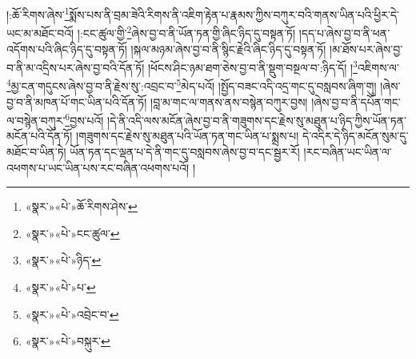 །:ཆོ་རིགས་ཞེས་\footnote{«སྣར་»«པེ་»ཆོ་རིགས་ཤེས་}སྨོས་པས་ནི་བྲམ་ཟེའི་རིགས་ནི་འཇིག་རྟེན་པ་རྣམས་ཀྱིས་བཀུར་བའི་གནས་ཡིན་པའི་ཕྱིར་དེ་ཡང་མ་མཐོང་བའོ། །:ངང་ཚུལ་གྱི་\footnote{«སྣར་»«པེ་»ངང་ཚུལ་}ཞེས་བྱ་བ་ནི་ཡོན་ཏན་གྱི་ཞིང་ཉིད་དུ་བསྟན་ཏོ། །དད་པ་ཞེས་བྱ་བ་ནི་ཕན་འདོགས་པའི་ཞིང་ཉིད་དུ་བསྟན་ཏོ། །སྐལ་མཉམ་ཞེས་བྱ་བ་ནི་སྙིང་རྗེའི་ཞིང་ཉིད་དུ་བསྟན་ཏོ། །མ་ཐོས་པར་ཞེས་བྱ་བ་ནི་མ་འདྲིས་པར་ཞེས་བྱ་བའི་དོན་ཏོ། །ཕོངས་ཤིང་ཉམ་ཐག་ཅེས་བྱ་བ་ནི་སྡུག་བསྔལ་བ་:ཉིད་དོ། །\footnote{«སྣར་»«པེ་»ཉིད་}འཇིགས་ལ་\footnote{«སྣར་»«པེ་»པ་}མྱ་ངན་གདུངས་ཞེས་བྱ་བ་ནི་རྗེས་སུ་:འབྲང་བ་\footnote{«སྣར་»«པེ་»འབྲེང་བ་}མེད་པའོ། །སྤྱོད་བཟང་འདི་འདྲ་གང་དུ་བསླབས་ཞིག་གུ། །ཞེས་བྱ་བ་ནི་མཁན་པོ་གང་ཡིན་པའི་དོན་ཏོ། །བླ་མ་གང་ལ་གནས་ནས་བསྙེན་བཀུར་བྱས། །ཞེས་བྱ་བ་ནི་དཔོན་གང་ལ་བསྙེན་བཀུར་\footnote{«སྣར་»«པེ་»བསྐུར་}བྱས་པའོ། །དེ་ནི་འདི་ལས་མངོན་ཞེས་བྱ་བ་ནི་གཟུགས་དང་རྗེས་སུ་མཐུན་པ་ཉིད་ཀྱིས་ཡོན་ཏན་མངོན་པའི་དོན་ཏོ། །གཟུགས་དང་རྗེས་སུ་མཐུན་པའི་ཡོན་ཏན་གང་ཡིན་པ་སྨྲས་པ། དེ་འདིར་དེ་ཉིད་མངོན་སུམ་དུ་མཐོང་བ་ཡིན་ཏེ། ཡོན་ཏན་དང་ལྡན་པ་དེ་ནི་གང་དུ་བསླབས་ཞེས་བྱ་བ་དང་སྦྱར་རོ། །རང་བཞིན་ཡང་ཡིན་ལ་འཕགས་པ་ཡང་ཡིན་པས་རང་བཞིན་འཕགས་པའོ། །

